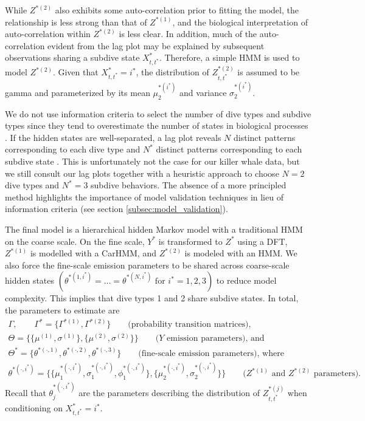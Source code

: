 While $Z^{*(2)}$ also exhibits some auto-correlation prior to fitting the model, the relationship is less strong than that of $Z^{*(1)}$, and the biological interpretation of auto-correlation within $Z^{*(2)}$ is less clear. In addition, much of the auto-correlation evident from the lag plot may be explained by subsequent observations sharing a subdive state $X^*_{t,t^*}$. Therefore, a simple HMM is used to model $Z^{*(2)}$. Given that $X^*_{t,t^*} = i^*$, the distribution of $Z^{*(2)}_{t,t^*}$ is assumed to be gamma and parameterized by its mean $\mu_2^{*(i^*)}$ and variance $\sigma_2^{*(i^*)}$.
%
%

We do not use information criteria to select the number of dive types and subdive types since they tend to overestimate the number of states in biological processes \citep{Pohle:2017}. If the hidden states are well-separated, a lag plot reveals $N$ distinct patterns corresponding to each dive type and $N^*$ distinct patterns corresponding to each subdive state \cite{Lawler:2019}. This is unfortunately not the case for our killer whale data, but we still consult our lag plots together with a heuristic approach to choose $N = 2$ dive types and $N^* = 3$ subdive behaviors. The absence of a more principled method highlights the importance of model validation techniques in lieu of information criteria (see section \ref{subsec:model_validation}). 

The final model is a hierarchical hidden Markov model with a traditional HMM on the coarse scale. On the fine scale, $Y^*$ is transformed to $Z^*$ using a DFT, $Z^{*(1)}$ is modelled with a CarHMM, and $Z^{*(2)}$ is modeled with an HMM. We also force the fine-scale emission parameters to be shared across coarse-scale hidden states $\left(\theta^{*(1,i^*)} = \ldots = \theta^{*(N,i^*)} \text{ for } i^* = 1,2,3\right)$ to reduce model complexity. This implies that dive types 1 and 2 share subdive states. In total, the parameters to estimate are
%
\begin{gather*}
    \Gamma, \qquad \Gamma^{*} = \{\Gamma^{*(1)},\Gamma^{*(2)}\} \qquad \text{(probability transition matrices)}, \\
    \Theta = \{\{\mu^{(1)},\sigma^{(1)}\},\{\mu^{(2)},\sigma^{(2)}\}\} \qquad \text{($Y$ emission parameters), and} \\
    \Theta^* = \{\theta^{*(\cdot,1)},\theta^{*(\cdot,2)},\theta^{*(\cdot,3)}\}  \qquad \text{(fine-scale emission parameters), where} \\
    \theta^{*(\cdot,i^*)} =  \{\{\mu_1^{*(\cdot,i^*)},\sigma_1^{*(\cdot,i^*)},\phi_1^{*(\cdot,i^*)}\},\{\mu_2^{*(\cdot,i^*)},\sigma_2^{*(\cdot,i^*)}\}\} \qquad \text{(}Z^{*(1)} \text{ and } Z^{*(2)} \text{ parameters).}
\end{gather*}
%
Recall that $\theta_j^{*(\cdot,i^*)}$ are the parameters describing the distribution of $Z^{*(j)}_{t,t^*}$ when conditioning on $X^*_{t,t^*} = i^*$. 

